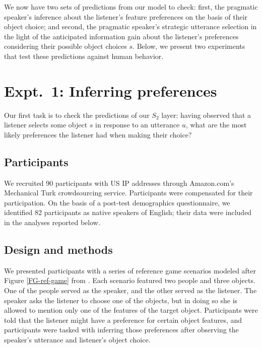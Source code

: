 \documentclass[10pt,a4paper]{article}
\begin{document}
We now have two sets of predictions from our model to check: first, the pragmatic speaker's inference about the listener's feature preferences on the basis of their object choice; and second, the pragmatic speaker's strategic utterance selection in the light of the anticipated information gain about the listener's preferences considering their possible object choices $s$. Below, we present two experiments that test these predictions against human behavior.


\section{Expt.~1: Inferring preferences}

Our first task is to check the predictions of our $S_2$ layer: having observed that a listener selects some object $s$ in response to an utterance $u$, what are the most likely preferences the listener had when making their choice? 

\subsection{Participants}

We recruited 90 participants with US IP addresses through Amazon.com's Mechanical Turk crowdsourcing service. Participants were compensated for their participation. On the basis of a post-test demographics questionnaire, we identified 82 participants as native speakers of English; their data were included in the analyses reported below.

\subsection{Design and methods}

We presented participants with a series of reference game scenarios modeled after Figure \ref{FG-ref-game} from . Each scenario featured two people and three objects. One of the people served as the speaker, and the other served as the listener. The speaker asks the listener to choose one of the objects, but in doing so she is allowed to mention only one of the features of the target object. Participants were told that the listener might have a preference for certain object features, and participants were tasked with inferring those preferences after observing the speaker's utterance and listener's object choice.
\end{document}
